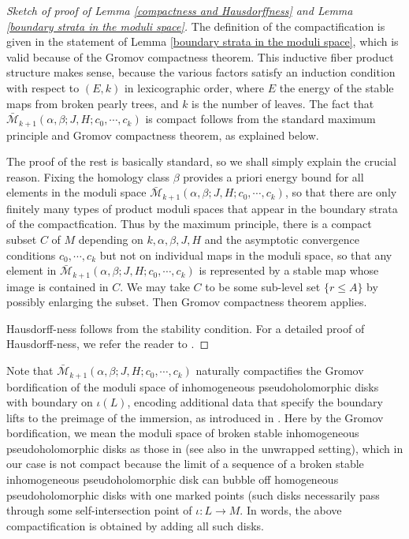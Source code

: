 \documentclass{amsart}
\numberwithin{equation}{section}
\numberwithin{figure}{section}
\begin{document}
\begin{proof}[Sketch of proof of Lemma \ref{compactness and Hausdorffness} and Lemma \ref{boundary strata in the moduli space}]
	The definition of the compactification is given in the statement of Lemma \ref{boundary strata in the moduli space}, which is valid because of the Gromov compactness theorem. This inductive fiber product structure makes sense, because the various factors satisfy an induction condition with respect to $(E, k)$ in lexicographic order, where $E$ the energy of the stable maps from broken pearly trees, and $k$ is the number of leaves. The fact that $\bar{\mathcal{M}}_{k+1}(\alpha, \beta; J, H; c_{0}, \cdots, c_{k})$ is compact follows from the standard maximum principle and Gromov compactness theorem, as explained below. \par
	The proof of the rest is basically standard, so we shall simply explain the crucial reason. Fixing the homology class $\beta$ provides a priori energy bound for all elements in the moduli space $\bar{\mathcal{M}}_{k+1}(\alpha, \beta; J, H; c_{0}, \cdots, c_{k})$, so that there are only finitely many types of product moduli spaces that appear in the boundary strata of the compactfication. Thus by the maximum principle, there is a compact subset $C$ of $M$ depending on $k, \alpha, \beta, J, H$ and the asymptotic convergence conditions $c_{0}, \cdots, c_{k}$ but not on individual maps in the moduli space, so that any element in $\bar{\mathcal{M}}_{k+1}(\alpha, \beta; J, H; c_{0}, \cdots, c_{k})$ is represented by a stable map whose image is contained in $C$. We may take $C$ to be some sub-level set $\{r \le A\}$ by possibly enlarging the subset. Then Gromov compactness theorem applies. \par
	Hausdorff-ness follows from the stability condition. For a detailed proof of Hausdorff-ness, we refer the reader to \cite{FOOO2}. \par
\end{proof}

	Note that $\bar{\mathcal{M}}_{k+1}(\alpha, \beta; J, H; c_{0}, \cdots, c_{k})$ naturally compactifies the Gromov bordification of the moduli space of inhomogeneous pseudoholomorphic disks with boundary on $\iota(L)$, encoding additional data that specify the boundary lifts to the preimage of the immersion, as introduced in \cite{Akaho-Joyce}. Here by the Gromov bordification, we mean the moduli space of broken stable inhomogeneous pseudoholomorphic disks as those in \cite{Abouzaid1} (see also \cite{Seidel} in the unwrapped setting), which in our case is not compact because the limit of a sequence of a broken stable inhomogeneous pseudoholomorphic disk can bubble off homogeneous pseudoholomorphic disks with one marked points (such disks necessarily pass through some self-intersection point of $\iota: L \to M$. In words, the above compactification is obtained by adding all such disks. \par
\end{document}
